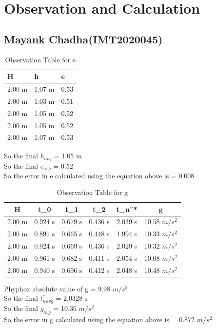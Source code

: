\documentclass[11pt]{scrartcl} %
\begin{document}
\section{Observation and Calculation}
\subsection{Mayank Chadha(IMT2020045)}

\begin{table}[h] %
	\centering %
	\begin{tabular}{l l l}
		\toprule
		\textbf{H} & \textbf{h} & \textbf{e} \\
		\midrule
		2.00 m & 1.07 m & 0.53\\
        2.00 m & 1.03 m & 0.51\\
        2.00 m & 1.05 m & 0.52\\
        2.00 m & 1.05 m & 0.52\\
        2.00 m & 1.07 m & 0.53\\
		\bottomrule
	\end{tabular}
	\caption{Observation Table for e}
\end{table}
So the final $h_{avg}$ = 1.05 m\\
So the final $e_{avg}$ = 0.52\\
So the error in e calculated using the equation above is  = 0.008 

\begin{table}[h]
\centering
\begin{tabular}{||c c c c c c||} 
\toprule
 \hline
 H & t_0 & t_1 & t_2 & t_n^* & g \\ [0.5ex] 
 \midrule
 \hline\hline
 2.00 m & 0.924 s & 0.679 s  & 0.436 s & 2.039 s & 10.58 $m/s^2$  \\ 
 \hline
 2.00 m & 0.891 s & 0.665 s & 0.448 s & 1.994 s & 10.33 $m/s^2$  \\
 \hline
 2.00 m & 0.924 s & 0.669 s & 0.436 s & 2.029 s  & 10.32 $m/s^2$   \\
 \hline
 2.00 m & 0.961 s & 0.682 s & 0.411 s & 2.054 s  & 10.08 $m/s^2$   \\
 \hline
 2.00 m & 0.940 s & 0.696 s & 0.412 s & 2.048 s  & 10.48 $m/s^2$  \\ [1ex]
 \bottomrule
 \hline
\end{tabular}
\caption{Observation Table for g}
\end{table}
Phyphox absolute value of g = 9.98 $m/s^2$ \\
So the final $t_n^*_{avg}$ = 2.0328 s\\
So the final $g_{avg}$ = 10.36 $m/s^2$\\
So the error in g calculated using the equation above is  = 0.872  $m/s^2$\\
\end{document}
